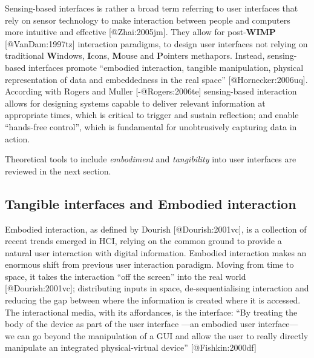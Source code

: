 Sensing-based interfaces is rather a broad term referring to user
interfaces that rely on sensor technology to make interaction between
people and computers more intuitive and effective {[}@Zhai:2005jm{]}.
They allow for post-\textbf{WIMP} {[}@VanDam:1997tz{]} interaction
paradigms, to design user interfaces not relying on traditional
\textbf{W}indows, \textbf{I}cons, \textbf{M}ouse and \textbf{P}ointers
methapors. Instead, sensing-based interfaces promote ``embodied
interaction, tangible manipulation, physical representation of data and
embeddedness in the real space'' {[}@Hornecker:2006uq{]}. According with
Rogers and Muller {[}-@Rogers:2006te{]} sensing-based interaction allows
for designing systems capable to deliver relevant information at
appropriate times, which is critical to trigger and sustain reflection;
and enable ``hands-free control'', which is fundamental for
unobtrusively capturing data in action.

Theoretical tools to include \emph{embodiment} and \emph{tangibility}
into user interfaces are reviewed in the next section.

\subsection{Tangible interfaces and Embodied
interaction}\label{tangible-interfaces-and-embodied-interaction}

Embodied interaction, as defined by Dourish {[}@Dourish:2001vc{]}, is a
collection of recent trends emerged in HCI, relying on the common ground
to provide a natural user interaction with digital information. Embodied
interaction makes an enormous shift from previous user interaction
paradigm. Moving from time to space, it takes the interaction ``off the
screen'' into the real world {[}@Dourish:2001vc{]}; distributing inputs
in space, de-sequentialising interaction and reducing the gap between
where the information is created where it is accessed. The interactional
media, with its affordances, is the interface: ``By treating the body of
the device as part of the user interface ---an embodied user
interface--- we can go beyond the manipulation of a GUI and allow the
user to really directly manipulate an integrated physical-virtual
device'' {[}@Fishkin:2000df{]}

